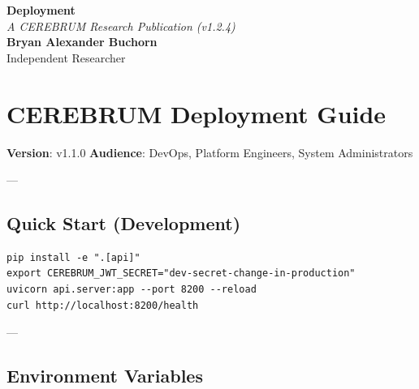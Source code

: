 \documentclass[11pt,article,oneside]{memoir}
\begin{document}
\begin{center}
    \Huge \textbf{Deployment} \\
    \vspace{0.5em}
    \large \textit{A CEREBRUM Research Publication (v1.2.4)} \\
    \vspace{1em}
    \large \textbf{Bryan Alexander Buchorn} \\
    Independent Researcher \\
    \vspace{2em}
\end{center}

\begin{abstract}
\textbf{Overview:} This guide provides a conceptual entry point into the CEREBRUM framework. It is designed for practitioners and researchers seeking to understand the core reasoning signals of Framework Implementation Guide.
\end{abstract}

\section{CEREBRUM Deployment Guide}

\textbf{Version}: v1.1.0
\textbf{Audience}: DevOps, Platform Engineers, System Admini\-strators

---

\subsection{Quick Start (Development)}

\begin{lstlisting}
pip install -e ".[api]"
export CEREBRUM_JWT_SECRET="dev-secret-change-in-production"
uvicorn api.server:app --port 8200 --reload
curl http://localhost:8200/health
\end{lstlisting}

---

\subsection{Environment Variables}
\end{document}

